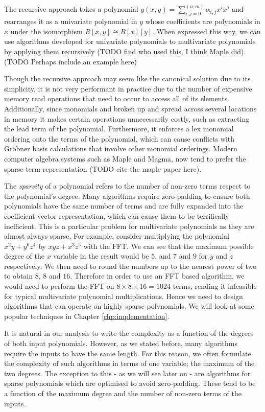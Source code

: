 The recursive approach takes a polynomial $g(x, y) = \sum_{i, j = 0}^(n,m) \alpha_{i, j} x^i x^j$ and rearranges it as a univariate polynomial in $y$ whose coefficients are polynomials in $x$ under the isomorphism $R[x, y] \cong R[x][y]$. When expressed this way, we can use algorithms developed for univariate polynomials to multivariate polynomials by applying them recursively (TODO find who used this, I think Maple did).
(TODO Perhaps include an example here)

Though the recursive approach may seem like the canonical solution due to its simplicity, it is not very performant in practice due to the number of expensive memory read operations that need to occur to access all of its elements. Additionally, since monomials and broken up and spread across several locations in memory it makes certain operations unnecessarily costly, such as extracting the lead term of the polynomial. Furthermore, it enforces a lex monomial ordering onto the terms of the polynomial, which can cause conflicts with Gr\"{o}bner basis calculations that involve other monomial orderings. Modern computer algebra systems such as Maple and Magma, now tend to prefer the sparse term representation (TODO cite the maple paper here).

The \emph{sparsity} of a polynomial refers to the number of non-zero terms respect to the polynomial's degree. Many algorithms require zero-padding to ensure both polynomials have the same number of terms and are fully expanded into the coefficient vector representation, which can cause them to be terrifically inefficient. This is a particular problem for multivariate polynomials as they are almost always sparse. For example, consider multiplying the polynomial $x^2y + y^6z^4$ by $xyz + x^3z^5$ with the FFT. We can see that the maximum possible degree of the $x$ variable in the result would be $5$, and $7$ and $9$ for $y$ and $z$ respectively. We then need to round the numbers up to the nearest power of two to obtain $8$, $8$ and $16$. Therefore in order to use an FFT based algorithm, we would need to perform the FFT on $8 \times 8 \times 16 = 1024$ terms, rending it infeasible for typical multivariate polynomial multiplications. Hence we need to design algorithms that can operate on highly sparse polynomials. We will look at some popular techniques in Chapter \ref{chp:implementation}.

It is natural in our analysis to write the complexity as a function of the degrees of both input polynomials. However, as we stated before, many algorithms require the inputs to have the same length. For this reason, we often formulate the complexity of such algorithms in terms of one variable; the maximum of the two degrees. The exception to this - as we will see later on - are algorithms for sparse polynomials which are optimised to avoid zero-padding. These tend to be a function of the maximum degree and the number of non-zero terms of the inputs.

